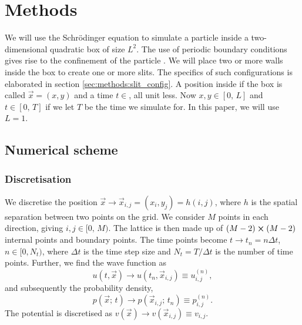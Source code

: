 
\section{Methods}\label{sec:methods}

We will use the Schrödinger equation to simulate a particle inside a two-dimensional quadratic box of size $L^2$. The use of periodic boundary conditions gives rise to the confinement of the particle . We will place two or more walls inside the box to create one or more slits. The specifics of such configurations is elaborated in section \ref{sec:methods:slit_config}. A position inside if the box is called $\vec{x} =(x, y)$ and a time $t\in$, all unit less. Now $x, y \in [0,\,L]$ and $t\in[0,\,T]$ if we let $T$ be the time we simulate for. In this paper, we will use $L=1$.

\subsection{Numerical scheme}


    \subsubsection{Discretisation}
        We discretise the position $\vec{x} \to \vec{x}_{i,j} = (x_i, y_j) = h(i,j)$, where $h$ is the spatial separation between two points on the grid. We consider $M$ points in each direction, giving $i, j \in [0,\, M)$. The lattice is then made up of $(M-2) \cross (M-2)$ internal points and boundary points. The time points become $t\to t_n=n\Delta t$, $n\in[0, N_t)$, where $\Delta t$ is the time step size and $N_t = T/\Delta t$ is the number of time points. Further, we find the wave function as
        \begin{equation}
            u(t, \vec{x}) \to u(t_n, \vec{x}_{i,j}) \equiv u_{i,j}^{(n)},
        \end{equation}
        and subsequently the probability density,
        \begin{equation}
            p(\vec{x};\, t) \to p(\vec{x}_{i,j};\, t_n) \equiv p_{i,j}^{(n)}.
        \end{equation}
        The potential is discretised as $v(\vec{x}) \to v(\vec{x}_{i,j})\equiv v_{i,j}$. 

